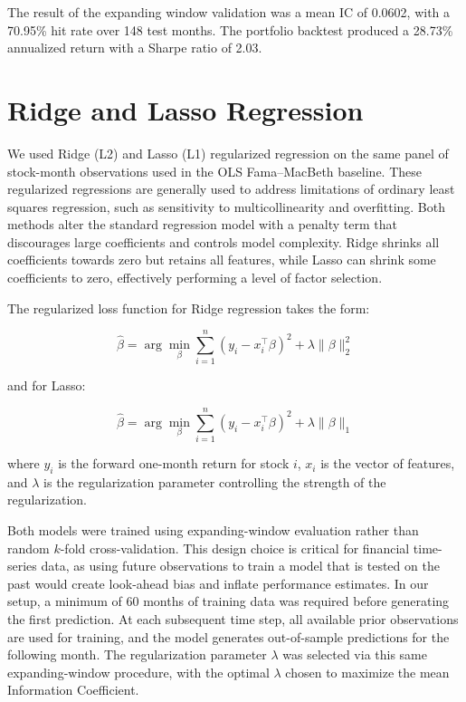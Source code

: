 \documentclass[11pt]{article}
\begin{document}
The result of the expanding window validation was a mean IC of 0.0602, with a 70.95\% hit rate over 148 test months. The portfolio backtest produced a 28.73\% annualized return with a Sharpe ratio of 2.03.

\section{Ridge and Lasso Regression}
\label{sec:ridge_lasso}

We used Ridge (L2) and Lasso (L1) regularized regression \cite{hoerl1970, tibshirani1996} on the same panel of stock-month observations used in the OLS Fama--MacBeth baseline. These regularized regressions are generally used to address limitations of ordinary least squares regression, such as sensitivity to multicollinearity and overfitting. Both methods alter the standard regression model with a penalty term that discourages large coefficients and controls model complexity. Ridge shrinks all coefficients towards zero but retains all features, while Lasso can shrink some coefficients to zero, effectively performing a level of factor selection.

The regularized loss function for Ridge regression takes the form:

\begin{equation}
    \hat{\beta} = \arg\min_{\beta} \sum_{i=1}^{n} (y_i - x_i^{\intercal} \beta)^2 + \lambda \|\beta\|_2^2
\end{equation}

and for Lasso:

\begin{equation}
    \hat{\beta} = \arg\min_{\beta} \sum_{i=1}^{n} (y_i - x_i^{\intercal} \beta)^2 + \lambda \|\beta\|_1
\end{equation}

where $y_i$ is the forward one-month return for stock $i$, $x_i$ is the vector of features, and $\lambda$ is the regularization parameter controlling the strength of the regularization.

Both models were trained using expanding-window evaluation rather than random $k$-fold cross-validation. This design choice is critical for financial time-series data, as using future observations to train a model that is tested on the past would create look-ahead bias and inflate performance estimates. In our setup, a minimum of 60 months of training data was required before generating the first prediction. At each subsequent time step, all available prior observations are used for training, and the model generates out-of-sample predictions for the following month. The regularization parameter $\lambda$ was selected via this same expanding-window procedure, with the optimal $\lambda$ chosen to maximize the mean Information Coefficient.
\end{document}
